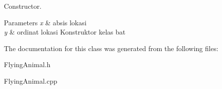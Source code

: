 Constructor. 


\begin{DoxyParams}{Parameters}
{\em x} & absis lokasi \\
\hline
{\em y} & ordinat lokasi Konstruktor kelas bat \\
\hline
\end{DoxyParams}


The documentation for this class was generated from the following files\+:\begin{DoxyCompactItemize}
\item 
Flying\+Animal.\+h\item 
Flying\+Animal.\+cpp\end{DoxyCompactItemize}
